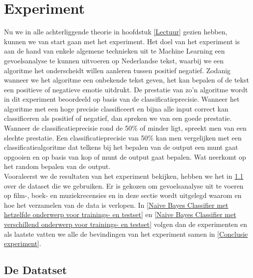 \chapter{Experiment}\label{Experiment}

Nu we in alle achterliggende theorie in hoofdstuk \ref{Lectuur} gezien hebben, kunnen we van start gaan met het experiment. Het doel van het experiment is aan de hand van enkele algemene technieken uit te Machine Learning een gevoelsanalyse te kunnen uitvoeren op Nederlandse tekst, waarbij we een algoritme het onderscheidt willen aanleren tussen positief negatief. Zodanig wanneer we het algoritme een onbekende tekst geven, het kan bepalen of de tekst een positieve of negatieve emotie uitdrukt. De prestatie van zo'n algoritme wordt in dit experiment beoordeeld op basis van de classificatieprecisie.  Wanneer het algoritme met een hoge precisie classificeert en bijna alle input correct kan classificeren als positief of negatief, dan spreken we van een goede prestatie. Wanneer de classificatieprecisie rond de 50\% of minder ligt, spreekt men van een slechte prestatie. Een classificatieprecisie van 50\% kan men vergelijken met een classificatiealgoritme dat telkens bij het bepalen van de output een munt gaat opgooien en op basis van kop of munt de output gaat bepalen. Wat neerkomt op het random bepalen van de output.\\
%
Vooraleerst we de resultaten van het experiment bekijken, hebben we het in \ref{De Dataset} over de dataset die we gebruiken. Er is gekozen om gevoelsanalyse uit te voeren op film-, boek- en muziekrecensies  en in deze sectie wordt uitgelegd waarom en hoe het verzamelen van de data is verlopen. In \ref{Naive Bayes Classifier met hetzelfde onderwerp voor trainings- en testset} en \ref{Naive Bayes Classifier met verschillend onderwerp voor trainings- en testset} volgen dan de experimenten en als laatste vatten we alle de bevindingen van het experiment samen in \ref{Conclusie experiment}.

\section{De Datatset}\label{De Dataset}


